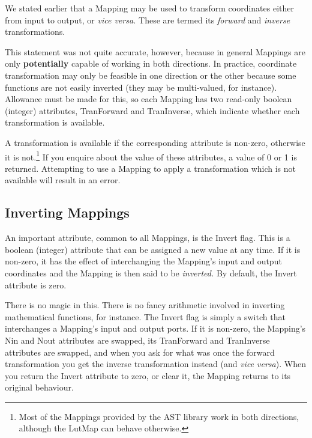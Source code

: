 \documentclass[twoside,11pt]{article}
\newcommand{\htmlref}[2]{#1}
\begin{document}
We stated earlier that a \htmlref{Mapping}{Mapping} may be used to transform coordinates
either from input to output, or {\em{vice versa.}} These are termed
its {\em{forward}} and {\em{inverse}} transformations.

This statement was not quite accurate, however, because in general
Mappings are only {\bf{potentially}} capable of working in both
directions. In practice, coordinate transformation may only be
feasible in one direction or the other because some functions are not
easily inverted (they may be multi-valued, for instance). Allowance
must be made for this, so each Mapping has two read-only boolean
(integer) attributes, \htmlref{TranForward}{TranForward} and \htmlref{TranInverse}{TranInverse}, which indicate
whether each transformation is available.

A transformation is available if the corresponding attribute is
non-zero, otherwise it is not.\footnote{Most of the Mappings provided
by the AST library work in both directions, although the \htmlref{LutMap}{LutMap} can
behave otherwise.} If you enquire about the value of these attributes,
a value of 0 or 1 is returned.  Attempting to use a Mapping to apply a
transformation which is not available will result in an error.

\subsection{\label{ss:invertingmappings}Inverting Mappings}

An important attribute, common to all Mappings, is the \htmlref{Invert}{Invert}
flag. This is a boolean (integer) attribute that can be assigned a new
value at any time. If it is non-zero, it has the effect of
interchanging the \htmlref{Mapping}{Mapping}'s input and output coordinates and the
Mapping is then said to be {\em{inverted.}} By default, the Invert
attribute is zero.

There is no magic in this. There is no fancy arithmetic involved in
inverting mathematical functions, for instance. The Invert flag is
simply a switch that interchanges a Mapping's input and output
ports. If it is non-zero, the Mapping's \htmlref{Nin}{Nin} and \htmlref{Nout}{Nout} attributes are
swapped, its \htmlref{TranForward}{TranForward} and \htmlref{TranInverse}{TranInverse} attributes are swapped, and
when you ask for what was once the forward transformation you get the
inverse transformation instead (and {\em{vice versa}}). When you
return the Invert attribute to zero, or clear it, the Mapping returns
to its original behaviour.
\end{document}

